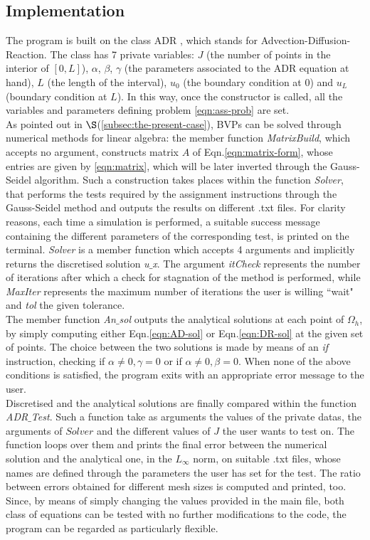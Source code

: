 \documentclass[11pt]{article}
\theoremstyle{theorem}
\theoremstyle{definition}
\begin{document}
\subsection{Implementation}
The program is built on the class ADR , which stands for Advection-Diffusion-Reaction. The class has 7 private variables: $J$ (the number of points in the interior of $[0,L]$), $\alpha$, $\beta$, $\gamma$ (the parameters associated to the ADR equation at hand), $L$ (the length of the interval), $u_0$ (the boundary condition at $0$) and $u_L$ (boundary condition at $L$). In this way, once the constructor is called, all the variables and parameters defining problem \eqref{eqn:ass-prob} are set.\\
As pointed out in $\S$(\ref{subsec:the-present-case}), BVPs can be solved through numerical methods for linear algebra: the member function \emph{MatrixBuild}, which accepts no argument, constructs matrix $A$ of Eqn.\eqref{eqn:matrix-form}, whose entries are given by \eqref{eqn:matrix}, which will be later inverted through the Gauss-Seidel algorithm. Such a construction takes places within the function \emph{Solver}, that performs the tests required by the assignment instructions through the Gauss-Seidel method and outputs the results on different .txt files. For clarity reasons,  each time a simulation is performed, a suitable success message containing the different parameters of the corresponding test, is printed on the terminal. \emph{Solver} is a member function which accepts 4 arguments and implicitly returns the discretised solution \emph{u$\_$x}. The argument \emph{itCheck} represents the number of iterations after which a check for stagnation of the method is performed, while \emph{MaxIter} represents the maximum number of iterations the user is willing ``wait" and \emph{tol} the given tolerance.\\ 
The member function \emph{An$\_$sol} outputs the analytical solutions at each point of $\Omega_h$, by simply computing either Eqn.\eqref{eqn:AD-sol} or Eqn.\eqref{eqn:DR-sol} at the given set of points. The choice between the two solutions is made by means of an \emph{if} instruction, checking if $\alpha\neq 0, \gamma=0$ or if $\alpha\neq 0, \beta=0$. When none of the above conditions is satisfied, the program exits with an appropriate error message to the user.\\
Discretised and the analytical solutions are finally compared within the function \emph{ADR$\_$Test}. Such a function take as arguments the values of the private datas, the arguments of $Solver$ and the different values of $J$ the user wants to test on. The function loops over them and prints the final error between the numerical solution and the analytical one, in the $L_\infty$ norm, on suitable .txt files, whose names are defined through the parameters the user has set for the test. The ratio between errors obtained for different mesh sizes is computed and printed, too.\\
Since, by means of simply changing the values provided in the main file, both class of equations can be tested with no further modifications to the code, the program can be regarded as particularly flexible.\\
\end{document}
